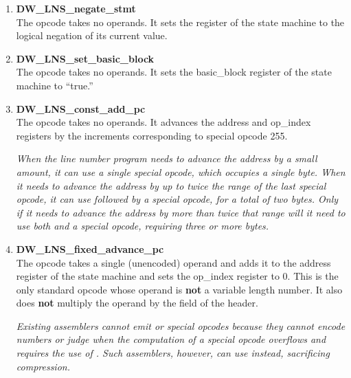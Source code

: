 \begin{enumerate}[1. ]
\item \textbf{DW\-\_LNS\-\_negate\-\_stmt} \\
The  opcode takes no
operands. It sets the  register of the state machine
to the logical negation of its current value.

\item \textbf{DW\-\_LNS\-\_set\-\_basic\-\_block} \\
The 
opcode
takes no operands. 
It sets the basic\_block register of the
state machine to ``true.''



\item \textbf{DW\-\_LNS\-\_const\-\_add\-\_pc} \\
The  opcode takes
no operands. It advances the address and op\_index registers
by the increments corresponding to special opcode 255.

\textit{When the line number program needs to advance the address
by a small amount, it can use a single special opcode,
which occupies a single byte. When it needs to advance the
address by up to twice the range of the last special opcode,
it can use  followed by a special opcode,
for a total of two bytes. Only if it needs to advance the
address by more than twice that range will it need to use
both  and a special opcode, requiring three
or more bytes.}

\item \textbf{DW\-\_LNS\-\_fixed\-\_advance\-\_pc} \\ 
The  opcode
takes a single  (unencoded) operand and adds it to the
address register of the state machine and sets the op\_index
register to 0. This is the only standard opcode whose operand
is \textbf{not} a variable length number. It also does 
\textbf{not} multiply the
operand by the  field of the header.

\textit{Existing assemblers cannot emit 
 or special
opcodes because they cannot encode  numbers or judge when
the computation of a special opcode overflows and requires
the use of . Such assemblers, however, can
use  instead, sacrificing compression.}


\end{enumerate}
